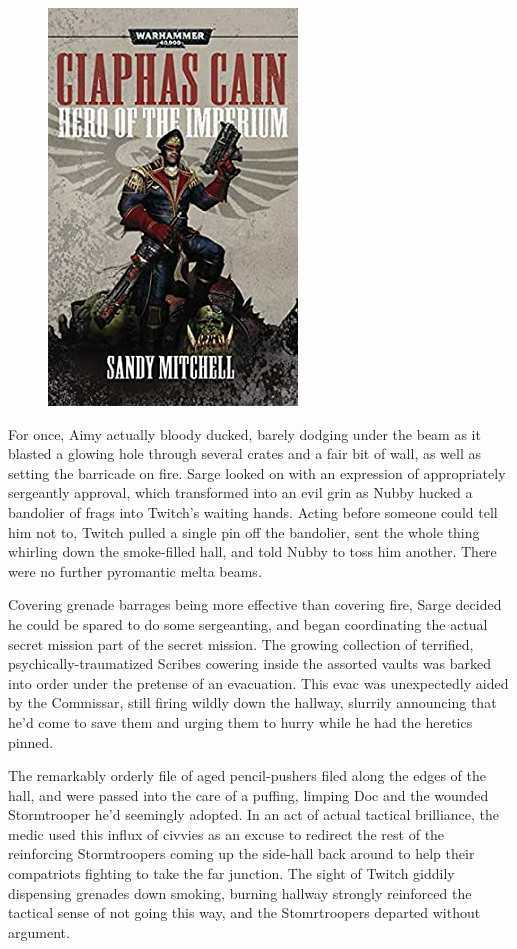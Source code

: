\begin{figure}
	\begin{center}
		\includegraphics[width=\figwidth]{pics/21/106.png}
	\end{center}
\end{figure}
For once, Aimy actually bloody ducked, barely dodging under the beam as it blasted a glowing hole through several crates and a fair bit of wall, as well as setting the barricade on fire. 
Sarge looked on with an expression of appropriately sergeantly approval, which transformed into an evil grin as Nubby hucked a bandolier of frags into Twitch's waiting hands. 
Acting before someone could tell him not to, Twitch pulled a single pin off the bandolier, sent the whole thing whirling down the smoke-filled hall, and told Nubby to toss him another. 
There were no further pyromantic melta beams.

Covering grenade barrages being more effective than covering fire, Sarge decided he could be spared to do some sergeanting, and began coordinating the actual secret mission part of the secret mission. 
The growing collection of terrified, psychically-traumatized Scribes cowering inside the assorted vaults was barked into order under the pretense of an evacuation. 
This evac was unexpectedly aided by the Commissar, still firing wildly down the hallway, slurrily announcing that he'd come to save them and urging them to hurry while he had the heretics pinned. 


The remarkably orderly file of aged pencil-pushers filed along the edges of the hall, and were passed into the care of a puffing, limping Doc and the wounded Stormtrooper he'd seemingly adopted. 
In an act of actual tactical brilliance, the medic used this influx of civvies as an excuse to redirect the rest of the reinforcing Stormtroopers coming up the side-hall back around to help their compatriots fighting to take the far junction. 
The sight of Twitch giddily dispensing grenades down smoking, burning hallway strongly reinforced the tactical sense of not going this way, and the Stomrtroopers departed without argument.

